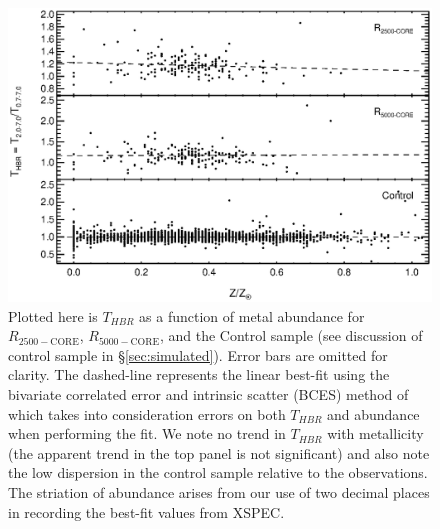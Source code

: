 \clearpage
\begin{figure}
\begin{center}
\includegraphics*[width=\textwidth, trim=0mm 0mm 0mm 0mm, clip]{f6.eps}
\caption{
Plotted here is $T_{HBR}$ as a function of metal abundance for 
$R_{2500-\mathrm{CORE}}$, $R_{5000-\mathrm{CORE}}$, and the Control
sample (see discussion of control sample in
\S\ref{sec:simulated}). Error bars are omitted for clarity. The
dashed-line represents the linear best-fit using the bivariate
correlated error and intrinsic scatter (BCES) method of
\cite{1996ApJ...470..706A} which takes into consideration errors on
both $T_{HBR}$ and abundance when performing the fit. We note no trend
in $T_{HBR}$ with metallicity (the apparent trend in the top panel is
not significant) and also note the low dispersion in the control
sample relative to the observations. The striation of abundance arises
from our use of two decimal places in recording the best-fit values
from {\textsc{XSPEC}}.
}
\label{fig:metal}
\end{center}
\end{figure}
\clearpage

